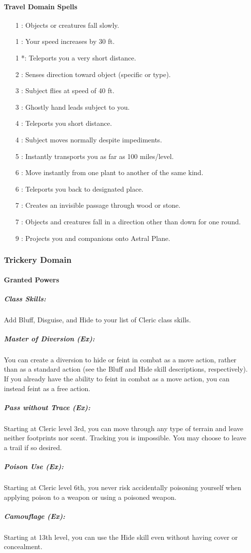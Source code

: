 \paragraph{Travel Domain Spells}
\begin{itemize}
\item[1] : Objects or creatures fall slowly.
\item[1] : Your speed increases by 30 ft.
\item[1] *: Teleports you a very short distance.
\item[2] : Senses direction toward object (specific or type).
\item[3] : Subject flies at speed of 40 ft.
\item[3] : Ghostly hand leads subject to you.
\item[4] : Teleports you short distance.
\item[4] : Subject moves normally despite impediments.
\item[5] : Instantly transports you as far as 100 miles/level.
\item[6] : Move instantly from one plant to another of the same kind.
\item[6] : Teleports you back to designated place.
\item[7] : Creates an invisible passage through wood or stone.
\item[7] : Objects and creatures fall in a direction other than down for one round.
\item[9] : Projects you and companions onto Astral Plane.
\end{itemize}
\subsubsection{Trickery Domain}
\paragraph{Granted Powers}
\subparagraph{Class Skills:} Add Bluff, Disguise, and Hide to your list of Cleric class skills.
\subparagraph{Master of Diversion (Ex):}
You can create a diversion to hide or feint in combat as a move action, rather than as a standard action (see the Bluff and Hide skill descriptions, respectively). 
If you already have the ability to feint in combat as a move action, you can instead feint as a free action.
\subparagraph{Pass without Trace (Ex):}
Starting at Cleric level 3rd, you can move through any type of terrain and leave neither footprints nor scent. Tracking you is impossible. You may choose to leave a trail if so desired.
\subparagraph{Poison Use (Ex):}
Starting at Cleric level 6th, you never risk accidentally poisoning yourself when applying poison to a weapon or using a poisoned weapon.
\subparagraph{Camouflage (Ex):}
Starting at 13th level, you can use the Hide skill even without having cover or concealment.
